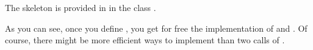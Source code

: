\label{sec:FiniteSetProperties}



The skeleton is provided in  in the class .

As you can see, once you define , you get for free the implementation of  and .
Of course, there might be more efficient ways to implement  than two calls of .
